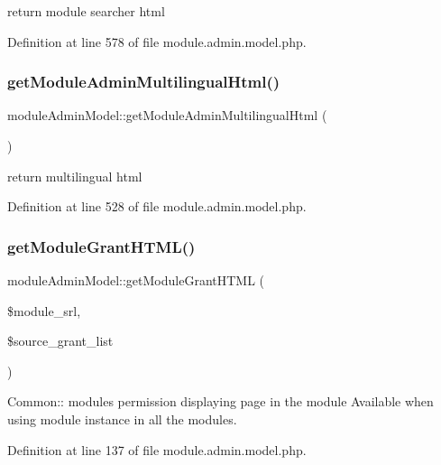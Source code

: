 return module searcher html 

Definition at line 578 of file module.\+admin.\+model.\+php.

\hypertarget{classmoduleAdminModel_a51568f16c761da74a811fe599970ea0f}{}\label{classmoduleAdminModel_a51568f16c761da74a811fe599970ea0f} 
\subsubsection{\texorpdfstring{get\+Module\+Admin\+Multilingual\+Html()}{getModuleAdminMultilingualHtml()}}
{\footnotesize\ttfamily module\+Admin\+Model\+::get\+Module\+Admin\+Multilingual\+Html (\begin{DoxyParamCaption}{ }\end{DoxyParamCaption})}

return multilingual html 

Definition at line 528 of file module.\+admin.\+model.\+php.

\hypertarget{classmoduleAdminModel_a0ab602897fb53096f7b232338c533839}{}\label{classmoduleAdminModel_a0ab602897fb53096f7b232338c533839} 
\subsubsection{\texorpdfstring{get\+Module\+Grant\+H\+T\+M\+L()}{getModuleGrantHTML()}}
{\footnotesize\ttfamily module\+Admin\+Model\+::get\+Module\+Grant\+H\+T\+ML (\begin{DoxyParamCaption}\item[{}]{\$module\+\_\+srl,  }\item[{}]{\$source\+\_\+grant\+\_\+list }\end{DoxyParamCaption})}



Common\+:\+: module\textquotesingle{}s permission displaying page in the module Available when using module instance in all the modules. 



Definition at line 137 of file module.\+admin.\+model.\+php.

